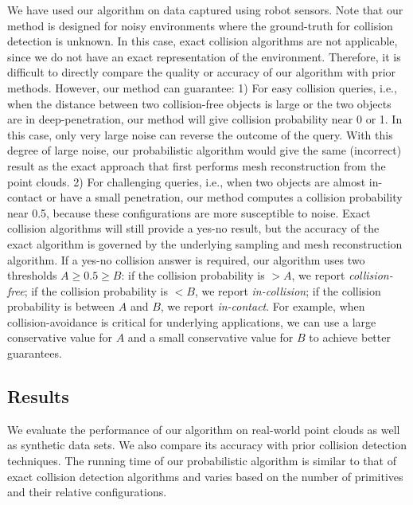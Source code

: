 We have used our algorithm on data captured using robot sensors. Note that our method is designed for noisy environments where the ground-truth for collision detection is unknown. In this case, exact collision algorithms are not applicable, since we do not have an exact representation of the environment.
Therefore, it is difficult to directly compare the quality or accuracy of our algorithm with prior methods. However, our method can guarantee: 1) For easy collision queries, i.e., when the distance between two collision-free objects is large or the two objects are in deep-penetration, our method will give collision probability near 0 or 1. In this case, only very large noise can reverse the outcome of the query. With this degree of large noise, our probabilistic algorithm would give the same (incorrect) result as the exact approach that first performs mesh reconstruction from the point clouds. 
2) For challenging queries, i.e., when two objects are almost in-contact or have a small penetration, our method computes a collision probability near 0.5, because these configurations are more susceptible to noise. Exact collision algorithms will still provide a yes-no result, but the accuracy of the exact algorithm is governed by the underlying sampling and mesh reconstruction algorithm. If a yes-no collision answer is required, our algorithm uses two thresholds $A \geq 0.5 \geq B$: if the collision probability is $>A$, we report \emph{collision-free}; if the collision probability is $< B$, we report \emph{in-collision}; if the collision probability is between $A$ and $B$, we report \emph{in-contact}. For example, when collision-avoidance is critical for underlying applications, we can use a large conservative value for $A$ and a small conservative value for $B$ to achieve better guarantees.

\subsection{Results}
We evaluate the performance of our algorithm on real-world point clouds as well as synthetic data sets. We also compare its accuracy with prior collision
detection techniques. The running time of our probabilistic algorithm is similar to that of exact collision detection algorithms and varies based on the
number of primitives and their relative configurations.

